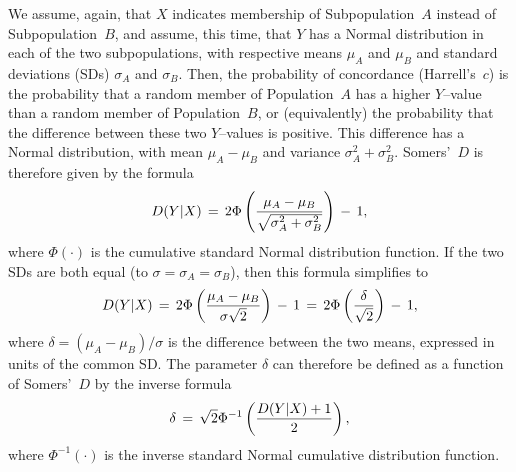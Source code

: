 \documentclass[a4paper,notitlepage]{article}      %
\begin{document}
We assume, again, that $X$ indicates membership of Subpopulation~$A$ instead of Subpopulation~$B$,
and assume, this time, that $Y$ has a Normal distribution in each of the two subpopulations,
with respective means $\mu_A$ and $\mu_B$
and standard deviations (SDs) $\sigma_A$ and $\sigma_B$.
Then, the probability of concordance (Harrell's~$c$)
is the probability that a random member of Population~$A$ has a higher $Y$--value than a random member of Population~$B$,
or (equivalently) the probability that the difference between these two $Y$--values is positive.
This difference has a Normal distribution, with mean $\mu_A-\mu_B$ and variance $\sigma_A^2+\sigma_B^2$.
Somers'~$D$ is therefore given by the formula
\begin{equation}
D(Y|X) \, = \, 2\Phi\left({{\mu_A-\mu_B}\over{\sqrt{\sigma_A^2+\sigma_B^2}}}\right) \, - \, 1,
\label{equation:eqseq22}
\end{equation}
where $\Phi(\cdot)$ is the cumulative standard Normal distribution function.
If the two SDs are both equal (to $\sigma=\sigma_A=\sigma_B$), then this formula simplifies to
\begin{equation}
D(Y|X) \, = \, 2\Phi\left({{\mu_A-\mu_B}\over{\sigma\sqrt{2}}}\right) \, - \, 1 \, = \, 2\Phi\left(\delta\over {\sqrt{2}}\right) \, - \, 1,
\label{eq:eqseq23}
\end{equation}
where $\delta=(\mu_A-\mu_B)/\sigma$ is the difference between the two means,
expressed in units of the common SD.
The parameter $\delta$ can therefore be defined as a function of Somers'~$D$ by the inverse formula
\begin{equation}
\delta \, = \, \sqrt{2} \Phi^{-1}\left( {{D(Y|X)+1}\over 2 } \right),
\label{equation:eqseq24}
\end{equation}
where $\Phi^{-1}(\cdot)$ is the inverse standard Normal cumulative distribution function.
\end{document}
